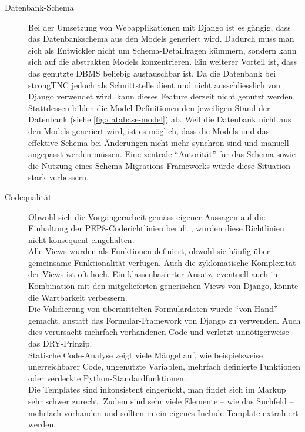 \begin{description}
\item[Datenbank-Schema] Bei der Umsetzung von Webapplikationen mit Django ist es
	gängig, dass das Datenbankschema aus den Models generiert wird. Dadurch muss
	man sich als Entwickler nicht um Schema-Detailfragen kümmern, sondern kann
	sich auf die abstrakten Models konzentrieren. Ein weiterer 
	Vorteil ist, dass das genutzte DBMS beliebig austauschbar ist. Da
	die Datenbank bei strongTNC jedoch als Schnittstelle dient und nicht
	ausschliesslich von Django verwendet wird, kann dieses Feature derzeit nicht
	genutzt werden. Stattdessen bilden die Model-Definitionen den jeweiligen Stand
	der Datenbank (siehe \autoref{fig:database-model}) ab. Weil die Datenbank
	nicht aus den Models generiert wird, ist es möglich, dass die Models und das
	effektive Schema bei Änderungen nicht mehr synchron sind und manuell angepasst
	werden müssen. Eine zentrale \enquote{Autorität} für das Schema sowie die
	Nutzung eines Schema-Migrations-Frameworks würde diese Situation stark
	verbessern.

\item[Codequalität] Obwohl sich die Vorgängerarbeit gemäss eigener Aussagen auf
	die Einhaltung der PEP8-Coderichtlinien\cite{PEP8:2001} beruft
	\cite[S.~79]{cygnet:2013}, wurden diese Richtlinien nicht konsequent
	eingehalten. \\
	Alle Views wurden als Funktionen definiert, obwohl sie häufig über gemeinsame
	Funktionalität verfügen. Auch die zyklomatische Komplexität der Views ist
	oft hoch. Ein klassenbasierter Ansatz, eventuell auch in Kombination
	mit den mitgelieferten generischen Views von Django, könnte die
	Wartbarkeit verbessern. \\
	Die Validierung von übermittelten Formulardaten wurde \enquote{von Hand}
	gemacht, anstatt das Formular-Framework von Django zu verwenden. Auch dies
	verursacht mehrfach vorhandenen Code und verletzt unnötigerweise das
	DRY-Prinzip\cite[S.~26--27]{hunt1999pragmatic}. \\
	Statische Code-Analyse zeigt viele Mängel auf, wie beispielsweise
	unerreichbarer Code, ungenutzte Variablen, mehrfach definierte Funktionen oder
	verdeckte Python-Standardfunktionen. \\
	Die Templates sind inkonsistent eingerückt, man findet sich im Markup sehr
	schwer zurecht. Zudem sind sehr viele Elemente -- wie \zb das Suchfeld --
	mehrfach vorhanden und sollten in ein eigenes Include-Template extrahiert
	werden.

\end{description}

